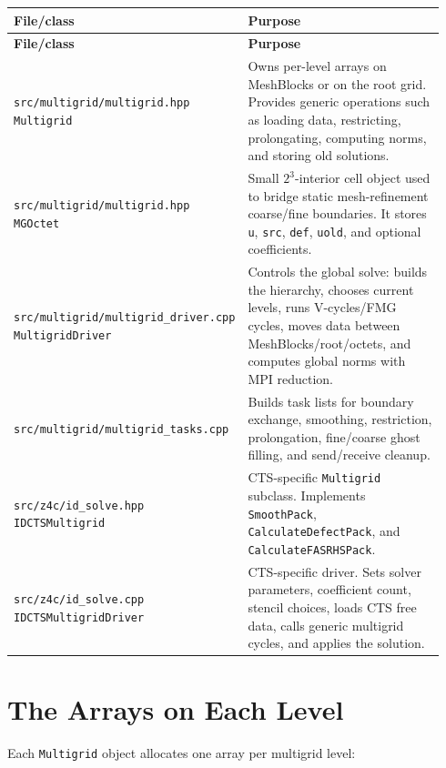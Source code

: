 \documentclass[11pt]{article}
\newcommand{\file}[1]{\nolinkurl{#1}}
\newcommand{\code}[1]{\texttt{#1}}
\begin{document}
\begin{longtable}{p{0.32\linewidth} p{0.62\linewidth}}
\toprule
\textbf{File/class} & \textbf{Purpose} \\
\midrule
\endfirsthead
\toprule
\textbf{File/class} & \textbf{Purpose} \\
\midrule
\endhead
\file{src/multigrid/multigrid.hpp} \newline \code{Multigrid} &
Owns per-level arrays on MeshBlocks or on the root grid.  Provides generic
operations such as loading data, restricting, prolongating, computing norms, and
storing old solutions. \\
\addlinespace
\file{src/multigrid/multigrid.hpp} \newline \code{MGOctet} &
Small \(2^3\)-interior cell object used to bridge static mesh-refinement
coarse/fine boundaries.  It stores \code{u}, \code{src}, \code{def},
\code{uold}, and optional coefficients. \\
\addlinespace
\file{src/multigrid/multigrid\_driver.cpp} \newline \code{MultigridDriver} &
Controls the global solve: builds the hierarchy, chooses current levels, runs
V-cycles/FMG cycles, moves data between MeshBlocks/root/octets, and computes
global norms with MPI reduction. \\
\addlinespace
\file{src/multigrid/multigrid\_tasks.cpp} &
Builds task lists for boundary exchange, smoothing, restriction, prolongation,
fine/coarse ghost filling, and send/receive cleanup. \\
\addlinespace
\file{src/z4c/id\_solve.hpp} \newline \code{IDCTSMultigrid} &
CTS-specific \code{Multigrid} subclass.  Implements \code{SmoothPack},
\code{CalculateDefectPack}, and \code{CalculateFASRHSPack}. \\
\addlinespace
\file{src/z4c/id\_solve.cpp} \newline \code{IDCTSMultigridDriver} &
CTS-specific driver.  Sets solver parameters, coefficient count, stencil choices,
loads CTS free data, calls generic multigrid cycles, and applies the solution. \\
\bottomrule
\end{longtable}

\section{The Arrays on Each Level}

Each \code{Multigrid} object allocates one array per multigrid level:
\end{document}
